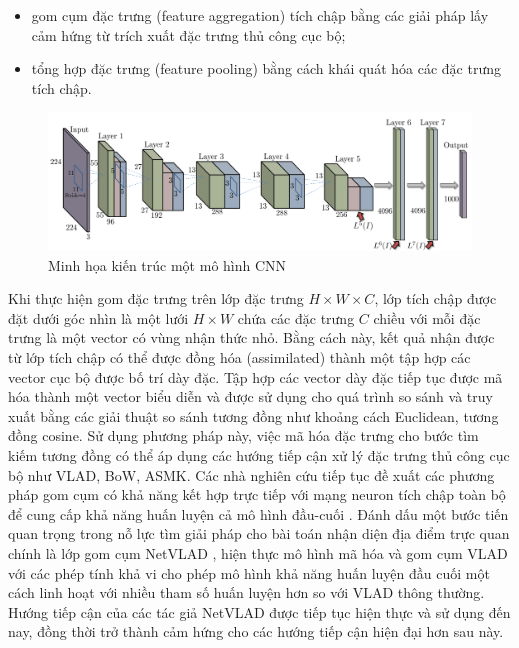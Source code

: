 \begin{itemize}
    \item gom cụm đặc trưng (feature aggregation) tích chập bằng các giải pháp lấy cảm hứng từ trích xuất đặc trưng thủ công cục bộ;
    \item tổng hợp đặc trưng (feature pooling) bằng cách khái quát hóa các đặc trưng tích chập.
\end{itemize}

\begin{figure}[h]
    \centering
    \includegraphics[width=\textwidth]{pics/Chapter2/firstcnns.png}
    \caption{Minh họa kiến trúc một mô hình CNN \cite{babenko2014neural}}
\end{figure}

Khi thực hiện gom đặc trưng trên lớp đặc trưng \(H \times W \times C\), lớp tích chập được đặt dưới góc nhìn là một lưới \(H \times W \) chứa các đặc trưng \(C\) chiều với mỗi đặc trưng là một vector có vùng nhận thức nhỏ. Bằng cách này, kết quả nhận được từ lớp tích chập có thể được đồng hóa (assimilated) thành một tập hợp các vector cục bộ được bố trí dày đặc. Tập hợp các vector dày đặc tiếp tục được mã hóa thành một vector biểu diễn và được sử dụng cho quá trình so sánh và truy xuất bằng các giải thuật so sánh tương đồng như khoảng cách Euclidean, tương đồng cosine. Sử dụng phương pháp này, việc mã hóa đặc trưng cho bước tìm kiếm tương đồng có thể áp dụng các hướng tiếp cận xử lý đặc trưng thủ công cục bộ như VLAD\cite{vlad}, BoW\cite{Mohedano_2016}, ASMK\cite{cao2020unifying}. Các nhà nghiên cứu tiếp tục đề xuất các phương pháp gom cụm có khả năng kết hợp trực tiếp với mạng neuron tích chập toàn bộ để cung cấp khả năng huấn luyện cả mô hình đầu-cuối \cite{ong2017siamese}. Đánh dấu một bước tiến quan trọng trong nỗ lực tìm giải pháp cho bài toán nhận diện địa điểm trực quan chính là lớp gom cụm NetVLAD \cite{arandjelovic2016netvlad}, hiện thực mô hình mã hóa và gom cụm VLAD với các phép tính khả vi cho phép mô hình khả năng huấn luyện đầu cuối một cách linh hoạt với nhiều tham số huấn luyện hơn so với VLAD thông thường. Hướng tiếp cận của các tác giả NetVLAD được tiếp tục hiện thực và sử dụng đến nay, đồng thời trở thành cảm hứng cho các hướng tiếp cận hiện đại hơn sau này.

